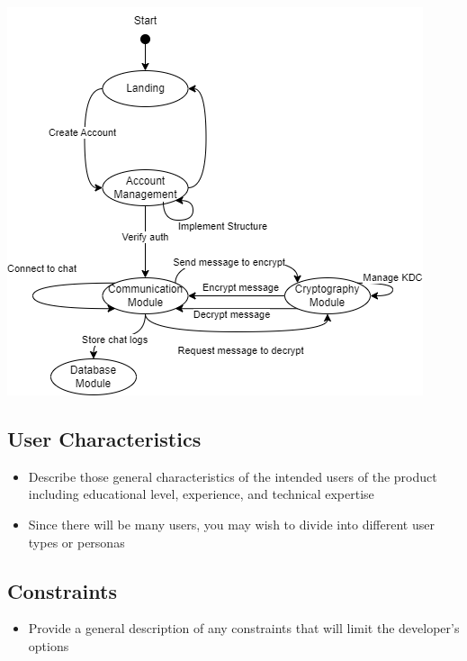 \documentclass[]{article}
\begin{document}
\begin{center}
	\includegraphics[scale = 0.8]{3A04_D1.png}
\end{center}

\subsection{User Characteristics}
\label{sub:user_characteristics}
\begin{itemize}
	\item Describe those general characteristics of the intended users of the product including educational level, experience, and technical expertise
	\item Since there will be many users, you may wish to divide into different user types or personas
\end{itemize}

\subsection{Constraints}
\label{sub:constraints}
\begin{itemize}
	\item Provide a general description of any constraints that will limit the developer's options
\end{itemize}
\end{document}
